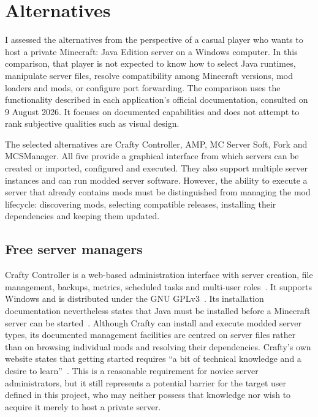 
\chapter{Alternatives}\label{chap:alternatives}

I assessed the alternatives from the perspective of a casual player who wants to host a private Minecraft: Java Edition server on a Windows computer. In this comparison, that player is not expected to know how to select Java runtimes, manipulate server files, resolve compatibility among Minecraft versions, mod loaders and mods, or configure port forwarding. The comparison uses the functionality described in each application's official documentation, consulted on 9 August 2026. It focuses on documented capabilities and does not attempt to rank subjective qualities such as visual design.

The selected alternatives are Crafty Controller, AMP, MC Server Soft, Fork and MCSManager. All five provide a graphical interface from which servers can be created or imported, configured and executed. They also support multiple server instances and can run modded server software. However, the ability to execute a server that already contains mods must be distinguished from managing the mod lifecycle: discovering mods, selecting compatible releases, installing their dependencies and keeping them updated.

\section{Free server managers}

Crafty Controller is a web-based administration interface with server creation, file management, backups, metrics, scheduled tasks and multi-user roles~\cite{CraftyDocs}. It supports Windows and is distributed under the GNU GPLv3~\cite{CraftyLicense}. Its installation documentation nevertheless states that Java must be installed before a Minecraft server can be started~\cite{CraftyJava}. Although Crafty can install and execute modded server types, its documented management facilities are centred on server files rather than on browsing individual mods and resolving their dependencies. Crafty's own website states that getting started requires ``a bit of technical knowledge and a desire to learn''~\cite{CraftyWebsite}. This is a reasonable requirement for novice server administrators, but it still represents a potential barrier for the target user defined in this project, who may neither possess that knowledge nor wish to acquire it merely to host a private server.

